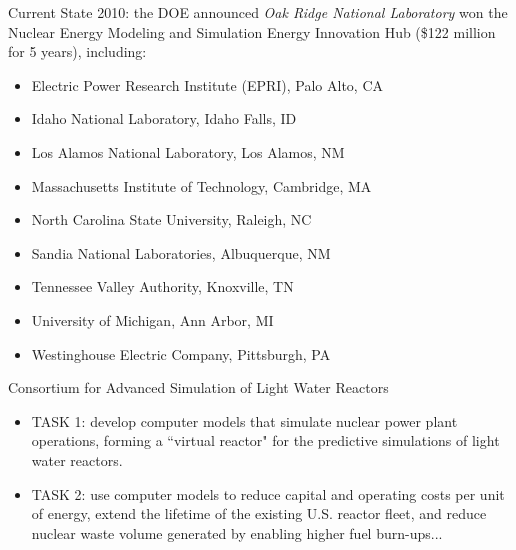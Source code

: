 \documentclass[xcolor=x11names,compress]{beamer}
\renewcommand{\(}{\begin{columns}}
\renewcommand{\)}{\end{columns}}
\newcommand{\<}[1]{\begin{column}{#1}}
\renewcommand{\>}{\end{column}}
\begin{document}
\begin{frame}{Current State}
2010: the DOE announced \emph{Oak Ridge National Laboratory} won the Nuclear Energy Modeling and Simulation Energy Innovation Hub (\$122 million for 5 years), including:	
\begin{itemize}
\item Electric Power Research Institute (EPRI), Palo Alto, CA
\item Idaho National Laboratory, Idaho Falls, ID
\item Los Alamos National Laboratory, Los Alamos, NM
\item Massachusetts Institute of Technology, Cambridge, MA
\item North Carolina State University, Raleigh, NC
\item Sandia National Laboratories, Albuquerque, NM
\item Tennessee Valley Authority, Knoxville, TN
\item University of Michigan, Ann Arbor, MI
\item Westinghouse Electric Company, Pittsburgh, PA
\end{itemize}
\end{frame}

\begin{frame}{Consortium for Advanced Simulation of Light Water Reactors}
\begin{center}
\end{center}
\begin{itemize}
\item \textcolor{RawSienna}{TASK 1}: develop computer models that simulate nuclear power plant operations, forming a ``virtual reactor" for the predictive simulations of light water reactors. 
\item \textcolor{RawSienna}{TASK 2}: use computer models to reduce capital and operating costs per unit of energy, extend the lifetime of the existing U.S. reactor fleet, and reduce nuclear waste volume generated by enabling higher fuel burn-ups... %
\end{itemize}
\end{frame}
\end{document}
